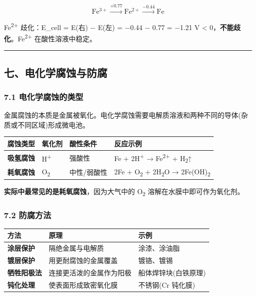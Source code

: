 \[\mathrm{Fe^{3+}} \xrightarrow{+0.77} \mathrm{Fe^{2+}} \xrightarrow{-0.44} \mathrm{Fe}\]

Fe\textsuperscript{2+} 歧化：E\_cell = E(右) − E(左) = −0.44 − 0.77 = −1.21 V \textless{} 0，\textbf{不能歧化}。Fe\textsuperscript{2+} 在酸性溶液中稳定。

\begin{center}\rule{0.5\linewidth}{0.5pt}\end{center}

\subsection{七、电化学腐蚀与防腐}\label{ux4e03ux7535ux5316ux5b66ux8150ux8680ux4e0eux9632ux8150}

\subsubsection{7.1 电化学腐蚀的类型}\label{ux7535ux5316ux5b66ux8150ux8680ux7684ux7c7bux578b}

金属腐蚀的本质是金属被氧化。电化学腐蚀需要电解质溶液和两种不同的导体(杂质或不同区域)形成微电池。

{\def\LTcaptype{none} %
\begin{longtable}[]{@{}llll@{}}
\toprule\noalign{}
腐蚀类型 & 氧化剂 & 酸性条件 & 反应示例 \\
\midrule\noalign{}
\endhead
\bottomrule\noalign{}
\endlastfoot
\textbf{吸氢腐蚀} & H\textsuperscript{+} & 强酸性 & Fe + 2H\textsuperscript{+} → Fe\textsuperscript{2+} + H\textsubscript{2}↑ \\
\textbf{耗氧腐蚀} & O\textsubscript{2} & 中性/弱酸性 & 2Fe + O\textsubscript{2} + 2H\textsubscript{2}O → 2Fe(OH)\textsubscript{2} \\
\end{longtable}
}

\textbf{实际中最常见的是耗氧腐蚀}，因为大气中的 O\textsubscript{2} 溶解在水膜中即可作为氧化剂。

\subsubsection{7.2 防腐方法}\label{ux9632ux8150ux65b9ux6cd5}

{\def\LTcaptype{none} %
\begin{longtable}[]{@{}lll@{}}
\toprule\noalign{}
方法 & 原理 & 示例 \\
\midrule\noalign{}
\endhead
\bottomrule\noalign{}
\endlastfoot
\textbf{涂层保护} & 隔绝金属与电解质 & 涂漆、涂油脂 \\
\textbf{镀层保护} & 用更耐腐蚀的金属覆盖 & 镀铬、镀锡 \\
\textbf{牺牲阳极法} & 连接更活泼的金属作为阳极 & 船体焊锌块(白铁原理) \\
\textbf{钝化处理} & 使表面形成致密氧化膜 & 不锈钢(Cr 钝化膜) \\
\end{longtable}
}


